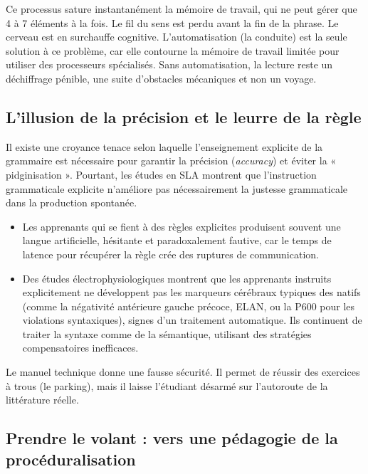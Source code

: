 Ce processus sature instantanément la mémoire de travail, qui ne peut gérer que 4 à 7 éléments à la
fois.\cite{III-3-3-ref14} Le fil du sens est perdu avant la fin de la phrase. Le cerveau est en
surchauffe cognitive. L'automatisation (la conduite) est la seule solution à ce problème, car elle
contourne la mémoire de travail limitée pour utiliser des processeurs
spécialisés.\cite{III-3-3-ref9} Sans automatisation, la lecture reste un déchiffrage pénible, une
suite d'obstacles mécaniques et non un voyage.



\subsection{L'illusion de la précision et le leurre de la règle}

Il existe une croyance tenace selon laquelle l'enseignement explicite de la grammaire est nécessaire
pour garantir la précision (\textit{accuracy}) et éviter la « pidginisation ». Pourtant, les études
en SLA montrent que l'instruction grammaticale explicite n'améliore pas nécessairement la justesse
grammaticale dans la production spontanée.\cite{III-3-3-ref42}

\begin{itemize}\item Les apprenants qui se fient à des règles explicites produisent souvent une langue artificielle, hésitante et paradoxalement fautive, car le temps de latence pour récupérer la règle crée des ruptures de communication.\item Des études électrophysiologiques montrent que les apprenants instruits explicitement ne développent pas les marqueurs cérébraux typiques des natifs (comme la négativité antérieure gauche précoce, ELAN, ou la P600 pour les violations syntaxiques), signes d'un traitement automatique.\cite{III-3-3-ref21} Ils continuent de traiter la syntaxe comme de la sémantique, utilisant des stratégies compensatoires inefficaces.\end{itemize}Le manuel technique donne une fausse sécurité. Il permet de réussir des exercices à trous (le
parking), mais il laisse l'étudiant désarmé sur l'autoroute de la littérature
réelle.\cite{III-3-3-ref45}



\subsection{Prendre le volant : vers une pédagogie de la procéduralisation}

